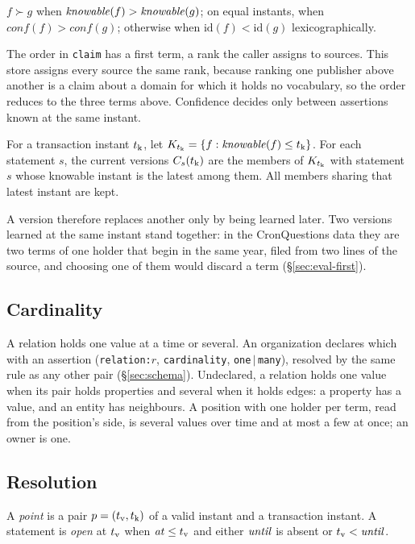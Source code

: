 \begin{definition}[Order]
$f \succ g$ when $\mathit{knowable}(f) > \mathit{knowable}(g)$; on equal instants, when
$\mathit{conf}(f) > \mathit{conf}(g)$; otherwise when
$\mathrm{id}(f) < \mathrm{id}(g)$ lexicographically.
\end{definition}

The order in \texttt{claim} has a first term, a rank the caller assigns to
sources. This store assigns every source the same rank, because ranking one
publisher above another is a claim about a domain for which it holds no
vocabulary, so the order reduces to the three terms above. Confidence
decides only between assertions known at the same instant.

\begin{definition}
For a transaction instant $t_{\mathrm{k}}$, let $K_{t_{\mathrm{k}}} = \{f : \mathit{knowable}(f) \le t_{\mathrm{k}}\}$.
For each statement $s$, the current versions $C_s(t_{\mathrm{k}})$ are the members of
$K_{t_{\mathrm{k}}}$ with statement $s$ whose knowable instant is the latest among them.
All members sharing that latest instant are kept.
\end{definition}

A version therefore replaces another only by being learned later. Two versions
learned at the same instant stand together: in the CronQuestions data they are
two terms of one holder that begin in the same year, filed from two lines of the
source, and choosing one of them would discard a term (\S\ref{sec:eval-first}).

\subsection{Cardinality}

A relation holds one value at a time or several. An organization declares which
with an assertion (\texttt{relation:}$r$, \texttt{cardinality},
\texttt{one}\,$|$\,\texttt{many}), resolved by the same rule as any other pair
(\S\ref{sec:schema}). Undeclared, a relation holds one value when its pair holds
properties and several when it holds edges: a property has a value, and an
entity has neighbours. A position with one holder per term, read from the
position's side, is several values over time and at most a few at once; an
owner is one.

\subsection{Resolution}

\begin{definition}
A \emph{point} is a pair $p = (t_{\mathrm{v}}, t_{\mathrm{k}})$ of a valid instant and a transaction
instant. A statement is \emph{open} at $t_{\mathrm{v}}$ when $\mathit{at} \le t_{\mathrm{v}}$ and either
$\mathit{until}$ is absent or $t_{\mathrm{v}} < \mathit{until}$.
\end{definition}

